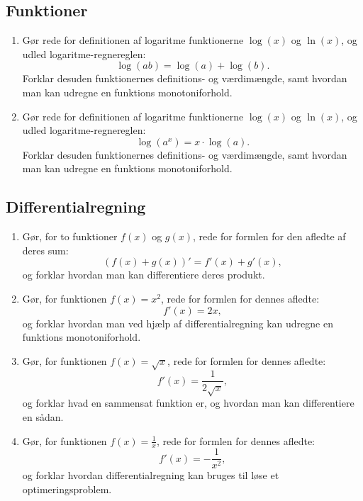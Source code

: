 \documentclass[10pt,a4paper]{article}
\begin{document}
\subsection*{Funktioner}
\begin{enumerate}[resume]
\item Gør rede for definitionen af logaritme funktionerne $\log(x)$ og $\ln(x)$, og udled logaritme-regnereglen:
$$\log(ab)=\log(a)+\log(b).$$
Forklar desuden funktionernes definitions- og værdimængde, samt hvordan man kan udregne en funktions monotoniforhold.
\item Gør rede for definitionen af logaritme funktionerne $\log(x)$ og $\ln(x)$, og udled logaritme-regnereglen:
$$\log(a^x)=x\cdot \log(a).$$
Forklar desuden funktionernes definitions- og værdimængde, samt hvordan man kan udregne en funktions monotoniforhold.
\end{enumerate}

\subsection*{Differentialregning}
\begin{enumerate}[resume]
\item Gør, for to funktioner $f(x)$ og $g(x)$, rede for formlen for den afledte af deres sum:
$$\left(f(x)+g(x)\right)'=f'(x)+g'(x),$$
og forklar hvordan man kan differentiere deres produkt.
\item Gør, for funktionen $f(x)=x^2$, rede for formlen for dennes afledte:
$$f'(x)=2x,$$
og forklar hvordan man ved hjælp af differentialregning kan udregne en funktions monotoniforhold.
\item Gør, for funktionen $f(x)=\sqrt{x}$, rede for formlen for dennes afledte:
$$f'(x)=\frac{1}{2\sqrt{x}},$$
og forklar hvad en sammensat funktion er, og hvordan man kan differentiere en sådan.
\item Gør, for funktionen $f(x)=\frac{1}{x}$, rede for formlen for dennes afledte:
$$f'(x)=-\frac{1}{x^2},$$
og forklar hvordan differentialregning kan bruges til løse et optimeringsproblem.
\end{enumerate}
\end{document}
